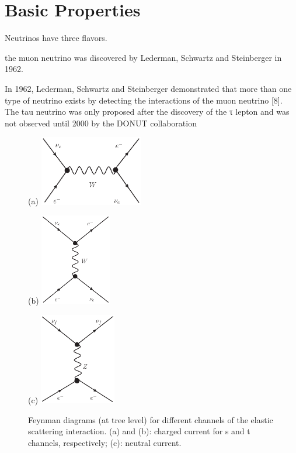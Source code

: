 \section{Basic Properties}

Neutrinos have three flavors.


the muon neutrino was discovered by Lederman, Schwartz and Steinberger in 1962.

In 1962, Lederman, Schwartz and Steinberger demonstrated that more than one
type of neutrino exists by detecting the interactions of the muon neutrino [8]. The tau
neutrino was only proposed after the discovery of the τ lepton and was not observed
until 2000 by the DONUT collaboration 

\begin{figure}[htbp]
	\centering
	\begin{minipage}[t]{0.45\textwidth}{(a)}
		\centering
		\includegraphics[width=4.5cm]{charged-1.eps}
	\end{minipage}
	\begin{minipage}[t]{0.3\textwidth}{(b)}
		\centering
		\includegraphics[height=4cm]{charged.eps}
	\end{minipage}
	\begin{minipage}[t]{0.4\textwidth}{(c)}
		\centering
		\includegraphics[height=4cm]{neutral.eps}
	\end{minipage}
	\caption{Feynman diagrams (at tree level) for different channels of the elastic scattering interaction. (a) and (b): charged current for s and t channels, respectively; (c): neutral current.}
	\label{feynman-es}
\end{figure}


